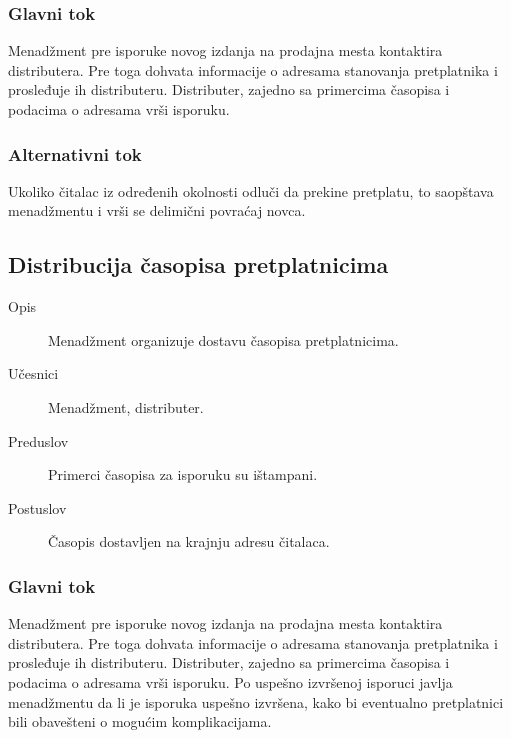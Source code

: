 \subsubsection{Glavni tok}
Menadžment pre isporuke novog izdanja na prodajna mesta kontaktira distributera. Pre toga dohvata informacije o adresama stanovanja pretplatnika i prosleđuje ih distributeru. 
Distributer, zajedno sa primercima časopisa i podacima o adresama vrši isporuku.
\subsubsection{Alternativni tok}
Ukoliko čitalac iz određenih okolnosti odluči da prekine pretplatu, to saopštava menadžmentu i vrši se delimični povraćaj novca.

\subsection{Distribucija časopisa pretplatnicima}
\begin{description}
\item [Opis] Menadžment organizuje dostavu časopisa pretplatnicima.
\item [Učesnici] Menadžment, distributer.
\item [Preduslov] Primerci časopisa za isporuku su ištampani.
\item [Postuslov] Časopis dostavljen na krajnju adresu čitalaca.
\end{description}
\subsubsection{Glavni tok}
Menadžment pre isporuke novog izdanja na prodajna mesta kontaktira distributera. Pre toga dohvata informacije o adresama stanovanja pretplatnika i prosleđuje ih distributeru. Distributer, zajedno sa primercima časopisa i podacima o adresama vrši isporuku.
Po uspešno izvršenoj isporuci javlja menadžmentu da li je isporuka uspešno izvršena, kako bi eventualno pretplatnici bili obavešteni o mogućim komplikacijama.


